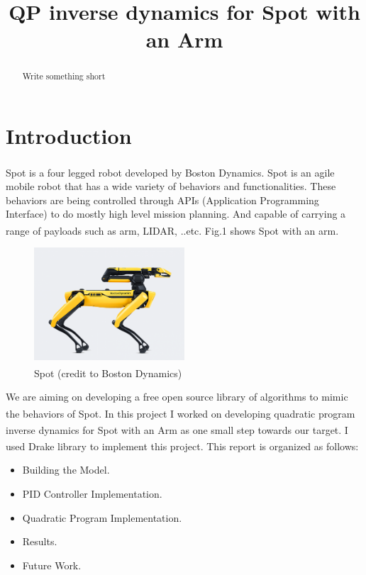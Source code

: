 \documentclass[conference]{IEEEtran}
\begin{document}
\title{QP inverse dynamics for Spot with an Arm}

\author{}


\maketitle

\begin{abstract}
Write something short

\end{abstract}

\section{Introduction}
Spot\textsuperscript{\textregistered} is a four legged robot developed by Boston Dynamics. 
Spot\textsuperscript{\textregistered} is an agile mobile robot that has a wide variety of behaviors and functionalities. 
These behaviors are being controlled through APIs (Application Programming Interface) to do mostly high level mission planning.
And capable of carrying a range of payloads such as arm, LIDAR, ..etc. Fig.1 shows Spot\textsuperscript{\textregistered}
with an arm.
\begin{figure}
    \includegraphics[width=0.5\textwidth]{figures/spot-arm-new-gray2x.png}
    \caption{Spot\textsuperscript{\textregistered} (credit to Boston Dynamics)}
    \label{fig:Spot}
\end{figure}
We are aiming on developing a free open source library of algorithms to mimic the behaviors of Spot\textsuperscript{\textregistered}.
In this project I worked on developing quadratic program inverse dynamics for Spot\textsuperscript{\textregistered} 
with an Arm as one small step towards our target. I used Drake\textsuperscript{\textregistered} library to implement this project.
This report is organized as follows:
\begin{itemize}
    \item Building the Model.
    \item PID Controller Implementation.
    \item Quadratic Program Implementation.
    \item Results.
    \item Future Work.
\end{itemize}
\end{document}
